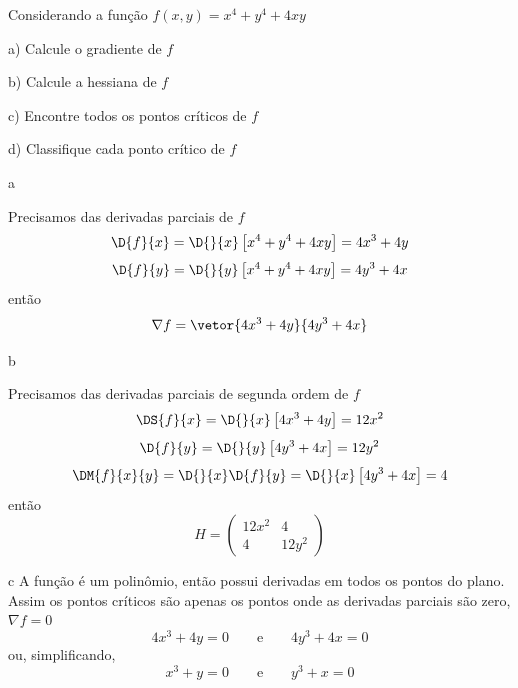 \begin{question}
  Considerando a função
  \(
    f(x, y) = x^4 + y^4 + 4xy
  \)

  a) Calcule o gradiente de $f$

  b) Calcule a hessiana de $f$

  c) Encontre todos os pontos críticos de $f$

  d) Classifique cada ponto crítico de $f$
\end{question}

\begin{resolution}{a}

  Precisamos das derivadas parciais de $f$
  \[
    \D{f}{x}
    = \D{}{x}\left[x^4 + y^4 + 4xy\right]
    = 4x^3 + 4y
  \]
  \[
    \D{f}{y}
    = \D{}{y}\left[x^4 + y^4 + 4xy\right]
    = 4y^3 + 4x
  \]
  então
  \[
    \nabla f = \vetor{4x^3 + 4y}{4y^3 + 4x}
  \]
\end{resolution}

\begin{resolution}{b}

  Precisamos das derivadas parciais de segunda ordem de $f$
  \[
    \DS{f}{x}
    = \D{}{x}\left[4x^3 + 4y\right]
    = 12x^2
  \]
  \[
    \D{f}{y}
    = \D{}{y}\left[4y^3 + 4x\right]
    = 12y^2
  \]
  \[
    \DM{f}{x}{y}
    = \D{}{x}\D{f}{y}
    = \D{}{x}\left[4y^3 + 4x\right]
    = 4
  \]
  então
  \[
    H = \left(\begin{array}{cc}
      12x^2 & 4 \\
      4 & 12y^2
    \end{array}\right)
  \]
\end{resolution}

\begin{resolution}{c}
  A função é um polinômio, então possui derivadas em todos os pontos do plano.
  Assim os pontos críticos são apenas os pontos onde as derivadas parciais são zero,
  \(\nabla f = 0\)
  \[
    4x^3 + 4y = 0
    \qquad\text{e}\qquad
    4y^3 + 4x = 0
  \]
  ou, simplificando,
  \[
    x^3 + y = 0
    \qquad\text{e}\qquad
    y^3 + x = 0
  \]
\end{resolution}

